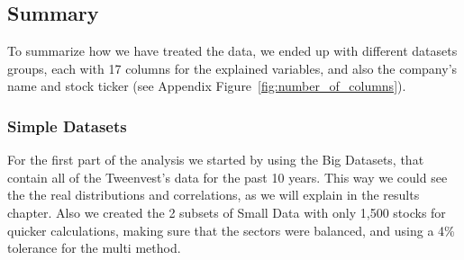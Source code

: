 \documentclass[11pt,english,a4paper,hidelinks]{book}
\begin{document}



\subsection{Summary}

\noindent To summarize how we have treated the data, we ended up with different datasets groups, each with 17 columns for the explained variables, and also the company's name and stock ticker (see Appendix Figure~\ref{fig:number_of_columns}).

\subsubsection{Simple Datasets}
\noindent For the first part of the analysis we started by using the Big Datasets, that contain all of the Tweenvest's data for the past 10 years. This way we could see the the real distributions and correlations, as we will explain in the results chapter. Also we created the 2 subsets of Small Data with only 1,500 stocks for quicker calculations, making sure that the sectors were balanced, and using a 4\% tolerance for the \acrshort{multi} method.
\end{document}
